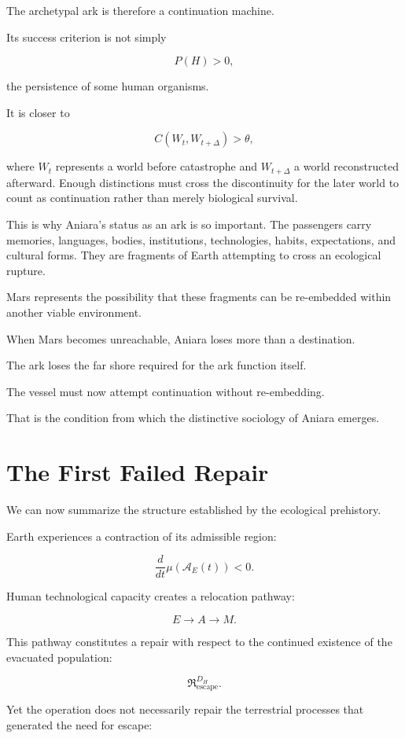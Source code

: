 \documentclass[11pt,oneside]{book}
\theoremstyle{definition}
\theoremstyle{remark}
\newcommand{\A}{\mathcal{A}}
\newcommand{\Repair}{\mathfrak{R}}
\begin{document}
The archetypal ark is therefore a continuation machine.

Its success criterion is not simply

\[
P(H)>0,
\]

the persistence of some human organisms.

It is closer to

\[
C(W_t,W_{t+\Delta})>\theta,
\]

where \(W_t\) represents a world before catastrophe and \(W_{t+\Delta}\) a world reconstructed afterward. Enough distinctions must cross the discontinuity for the later world to count as continuation rather than merely biological survival.

This is why Aniara's status as an ark is so important. The passengers carry memories, languages, bodies, institutions, technologies, habits, expectations, and cultural forms. They are fragments of Earth attempting to cross an ecological rupture.

Mars represents the possibility that these fragments can be re-embedded within another viable environment.

When Mars becomes unreachable, Aniara loses more than a destination.

The ark loses the far shore required for the ark function itself.

The vessel must now attempt continuation without re-embedding.

That is the condition from which the distinctive sociology of Aniara emerges.

\section{The First Failed Repair}

We can now summarize the structure established by the ecological prehistory.

Earth experiences a contraction of its admissible region:

\[
\frac{d}{dt}\mu(\A_E(t))<0.
\]

Human technological capacity creates a relocation pathway:

\[
E
\rightarrow
A
\rightarrow
M.
\]

This pathway constitutes a repair with respect to the continued existence of the evacuated population:

\[
\Repair^{D_H}_{\mathrm{escape}}.
\]

Yet the operation does not necessarily repair the terrestrial processes that generated the need for escape:
\end{document}
